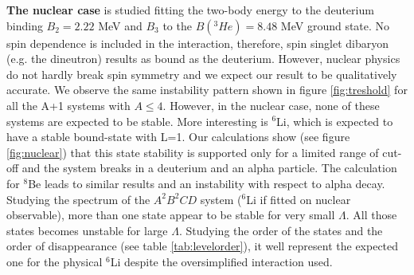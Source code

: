 \documentclass[preprint,12pt]{elsarticle}
\begin{document}
\begin{figure}[h] 
\centering 
\begin{floatrow}

\end{floatrow}
\end{figure} 


\textbf{The nuclear case} is studied fitting the two-body energy to the deuterium binding $B_2=2.22$ MeV and $B_3$ to the $B(^3He)=8.48$ MeV ground state. 
No spin dependence is included in the interaction, therefore, spin singlet dibaryon (e.g. the dineutron) results as bound as the deuterium.
However, nuclear physics do not hardly break spin symmetry and we expect our result to be qualitatively accurate.
We observe the same instability pattern shown in figure \ref{fig:treshold} for all the A+1 systems with $A\le 4$.
However, in the nuclear case, none of these systems are expected to be stable. 
More interesting is $^6$Li, which is expected to have a stable bound-state with L=1.
Our calculations show (see figure \ref{fig:nuclear}) that this state stability is supported only for a limited range of cut-off and the system breaks in a deuterium and an alpha particle.
The calculation for $^8$Be leads to similar results and an instability with respect to alpha decay.
Studying the spectrum of the $A^2B^2CD$ system ($^6$Li if fitted on nuclear observable), more than one state appear to be stable for very small $\Lambda$.
All those states becomes unstable for large $\Lambda$. 
Studying the order of the states and the order of disappearance (see table \ref{tab:levelorder}), it well represent the expected one for the physical $^6$Li despite the oversimplified interaction used.
\end{document}
